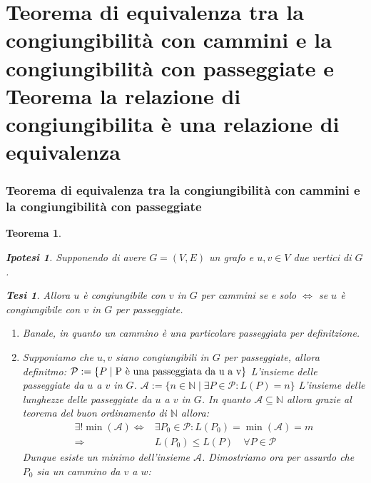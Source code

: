 \documentclass{article}
\makeatletter
\renewenvironment{proof}[1][\proofname]{\par
    \pushQED{\qed}%
    \normalfont \topsep6\p@\@plus6\p@\relax
    \trivlist
    \item\relax
    {\itshape
    #1\@addpunct{.}}\hspace\labelsep\ignorespaces
    }{%
    \popQED\endtrivlist\@endpefalse
}
\newtheorem{theorem}{Teorema}[part]
\newtheorem{ipothesis}[lemma]{Ipotesi}
\newtheorem{thesis}[lemma]{Tesi}
\newcommand{\N}{\mathbb{N}}
\makeatother
\begin{document}
\part{Teorema di equivalenza tra la congiungibilità con cammini e la congiungibilità con passeggiate e Teorema la relazione di congiungibilita è una relazione di equivalenza}
    \section{Teorema di equivalenza tra la congiungibilità con cammini e la congiungibilità con passeggiate}
        \begin{theorem}
            \begin{ipothesis}
                Supponendo di avere \(G=(V,E)\) un grafo e \(u,v\in V\) due vertici di \(G\).
            \end{ipothesis}
            \begin{thesis}
                Allora \(u\) è congiungibile con \(v\) in \(G\) per cammini se e solo \(\Leftrightarrow\) se \(u\) è congiungibile con \(v\) in \(G\) per passeggiate.
            \end{thesis}
            \begin{proof}
                \begin{enumerate}
                    \item[$\Rightarrow$] Banale, in quanto un cammino è una particolare passeggiata per definitzione.
                    \item[$\Leftarrow$] Supponiamo che \(u,v\) siano congiungibili in \(G\) per passeggiate, allora definitmo: \(\mathcal{P}:=\{P\mid\\ \text{P è una passeggiata da u a v}\}\) L'insieme delle passeggiate da \(u\) a \(v\) in \(G\). $\mathcal{A}:=\{n\in\N \mid \exists P\in\mathcal{P} : L(P)=n\}$ L'insieme delle lunghezze delle passeggiate da \(u\) a \(v\) in \(G\). 
                        In quanto \(\mathcal{A}\subseteq \N\) allora grazie al teorema del buon ordinamento di \(\N\) allora: 
                        \begin{align*}
                            \exists! \min(\mathcal{A})\Leftrightarrow & \exists P_0\in\mathcal{P}: L(P_0)=\min(\mathcal{A})=m \\
                            \Rightarrow & L(P_0)\leq L(P)\quad \forall P\in\mathcal{P}
                        \end{align*}
                        Dunque esiste un minimo dell'insieme \(\mathcal{A}\).
                        Dimostriamo ora per assurdo che \(P_0\) sia un cammino da \(v\) a \(w\):

\end{enumerate}
\end{proof}
\end{theorem}
\end{document}
